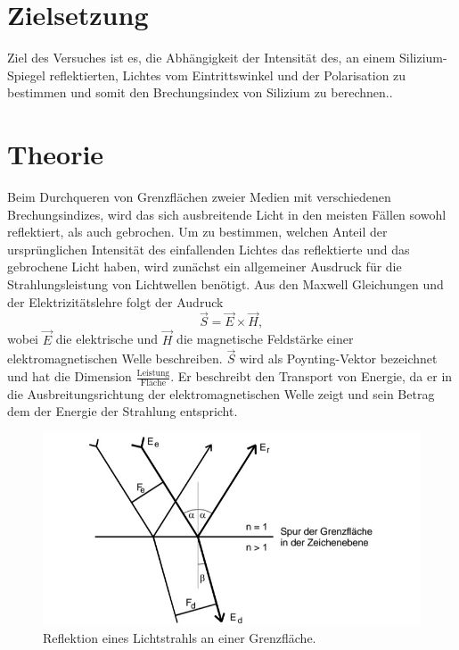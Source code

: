 \section{Zielsetzung}
\label{sec:Zielsetzung}

Ziel des Versuches ist es, die Abhängigkeit der Intensität des, an einem Silizium-Spiegel reflektierten, Lichtes vom Eintrittswinkel und der Polarisation zu bestimmen und somit den Brechungsindex von Silizium zu berechnen.. 

\section{Theorie}
\label{sec:Theorie}

Beim Durchqueren von Grenzflächen zweier Medien mit verschiedenen Brechungsindizes, wird das sich ausbreitende Licht in den meisten Fällen sowohl reflektiert, als
auch gebrochen. Um zu bestimmen, welchen Anteil der ursprünglichen Intensität des einfallenden Lichtes das reflektierte und das gebrochene Licht haben, wird
zunächst ein allgemeiner Ausdruck für die Strahlungsleistung von Lichtwellen benötigt.
\newline
Aus den Maxwell Gleichungen und der Elektrizitätslehre folgt der Audruck 
\begin{equation}
    \vec{S} = \vec{E} \times \vec{H},
\end{equation}
wobei $\vec{E}$ die elektrische und $\vec{H}$ die magnetische Feldstärke einer elektromagnetischen Welle beschreiben. $\vec{S}$ wird als Poynting-Vektor bezeichnet
und hat die Dimension $\frac{\text{Leistung}}{\text{Fläche}}$. Er beschreibt den Transport von Energie, da er in die Ausbreitungsrichtung der elektromagnetischen
Welle zeigt und sein Betrag dem der Energie der Strahlung entspricht.

\begin{figure}[H]
	\centering
	\includegraphics[width=0.6\linewidth]{data/v407Brechung.jpg}
	\caption{Reflektion eines Lichtstrahls an einer Grenzfläche.\cite{Anleitung407}}
	\label{fig:brechung}
\end{figure}

